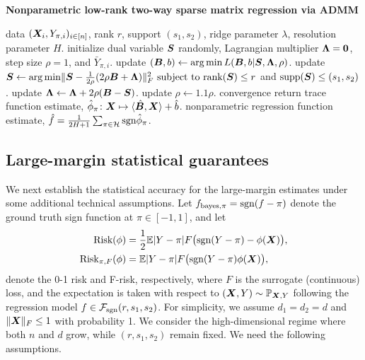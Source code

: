 \documentclass[aos]{imsart}
\theoremstyle{definition}
\def\sign{\textup{sgn}}
\def\rank{\textup{rank}}
\def\risk{\textup{Risk}}
\def\bayespif{f_{\textup{bayes},\pi}}
\def\caliF{\tF_{\textup{sgn}}}
\def\riskF{\textup{Risk}_{\pi,F}}
\begin{document}
\begin{algorithm}[t!]
\caption{{\bf Nonparametric low-rank two-way sparse matrix regression via ADMM} } \label{alg:weighted}
\begin{algorithmic}[1] 
\INPUT data $(\bm X_i,Y_{\pi, i})_{i\in[n]}$, rank $r$, support $(s_1,s_2)$, ridge parameter $\lambda$, resolution parameter $H$.
\State initialize dual variable $\bm S$ randomly, Lagrangian multiplier $\bm{\Lambda}=\mathbf{0}$, step size $\rho=1$, and $\bar Y_{\pi, i}$.
\Repeat
\State update $(\bm B,b) \leftarrow \operatorname*{arg\,min} L(\bm B, b|\bm S,\bm{\Lambda},\rho)$.
\State update $\mS \leftarrow  \argmin \FnormSize{}{\mS-{1\over 2\rho}(2\rho\mB+\mLambda)}^2 \ \text{subject to }\rank(\mS)\leq r$ and $\text{supp}(\bm S)\leq (s_1,s_2)$.
\State update $\bm{\Lambda} \leftarrow \bm{\Lambda}+2\rho(\bm B-\bm S)$.
\State update $\rho\leftarrow1.1\rho$.
\Until convergence
\State return trace function estimate, $\hat \phi_\pi\colon \bm X\mapsto \langle \hat {\bm B}, \bm X \rangle+\hat b$.
\EndFor
\OUTPUT nonparametric regression function estimate, $\hat f= {1\over 2H+1}\sum_{\pi \in \tH}\sign \hat \phi_\pi$.
\end{algorithmic}
\end{algorithm}



\subsection{Large-margin statistical guarantees}\label{sec:large-margin}

We next establish the statistical accuracy for the large-margin estimates under some additional technical assumptions. Let $\bayespif=\sign(f-\pi)$ denote the ground truth sign function at $\pi\in[-1,1]$, and let
\begin{align}
\risk(\phi) & =  {1\over 2}\mathbb{E}|Y-\pi|F\big(\sign(Y-\pi)-\phi(\mX)\big), \notag \\
\riskF(\phi) & =  \mathbb{E}|Y-\pi|F\big(\sign(Y-\pi)\phi(\mX)\big), 
\end{align}
denote the 0-1 risk and F-risk, respectively, where $F$ is the surrogate (continuous) loss, and the expectation is taken with respect to $(\bm X,Y)\sim \mathbb{P}_{\bm X,Y}$ following the regression model $f\in\caliF(r,s_1,s_2)$. For simplicity, we assume $d_1 = d_2 = d$ and $\lVert\bm X\rVert_F\leq 1$ with probability 1. We consider the high-dimensional regime where both $n$ and $d$ grow, while $(r,s_1,s_2)$ remain fixed. We need the following assumptions. 
 
\end{document}
